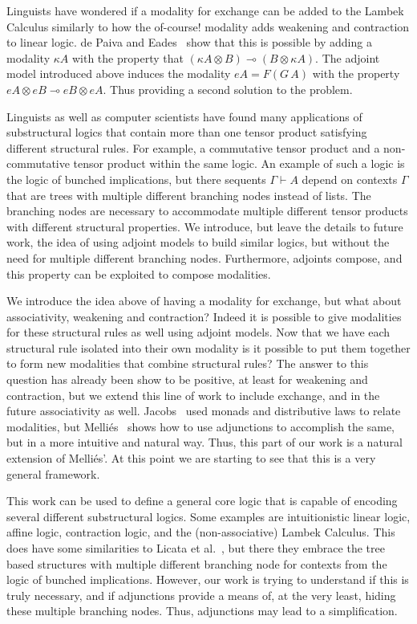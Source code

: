 Linguists have wondered if a modality for exchange can be added to the
Lambek Calculus similarly to how the of-course! modality adds
weakening and contraction to linear logic.  de Paiva and
Eades~\cite{?} show that this is possible by adding a modality $\kappa
A$ with the property that $(\kappa A \otimes B) \multimap (B \otimes
\kappa A)$.  The adjoint model introduced above induces the modality
$eA = F(G\,A)$ with the property $eA \otimes eB \multimap eB \otimes
eA$.  Thus providing a second solution to the problem.

Linguists as well as computer scientists have found many applications
of substructural logics that contain more than one tensor product
satisfying different structural rules.  For example, a commutative
tensor product and a non-commutative tensor product within the same
logic.  An example of such a logic is the logic of bunched
implications, but there sequents $\Gamma \vdash A$ depend on contexts
$\Gamma$ that are trees with multiple different branching nodes
instead of lists.  The branching nodes are necessary to accommodate
multiple different tensor products with different structural
properties.  We introduce, but leave the details to future work, the
idea of using adjoint models to build similar logics, but without the
need for multiple different branching nodes.  Furthermore, adjoints
compose, and this property can be exploited to compose modalities.

We introduce the idea above of having a modality for exchange, but
what about associativity, weakening and contraction?  Indeed it is
possible to give modalities for these structural rules as well using
adjoint models.  Now that we have each structural rule isolated into
their own modality is it possible to put them together to form new
modalities that combine structural rules?  The answer to this question
has already been show to be positive, at least for weakening and
contraction, but we extend this line of work to include exchange, and
in the future associativity as well.  Jacobs~\cite{JACOBS199473} used
monads and distributive laws to relate modalities, but
Melli{\'e}s~\cite{Mellies:2004} shows how to use adjunctions to
accomplish the same, but in a more intuitive and natural way.  Thus,
this part of our work is a natural extension of Melli{\'e}s'.  At this
point we are starting to see that this is a very general framework.

This work can be used to define a general core logic that is capable
of encoding several different substructural logics.  Some examples are
intuitionistic linear logic, affine logic, contraction logic, and the
(non-associative) Lambek Calculus.  This does have some similarities
to Licata et al.~\cite{licata2017fibrational}, but there they embrace
the tree based structures with multiple different branching node for
contexts from the logic of bunched implications.  However, our work is
trying to understand if this is truly necessary, and if adjunctions
provide a means of, at the very least, hiding these multiple branching
nodes.  Thus, adjunctions may lead to a simplification.
